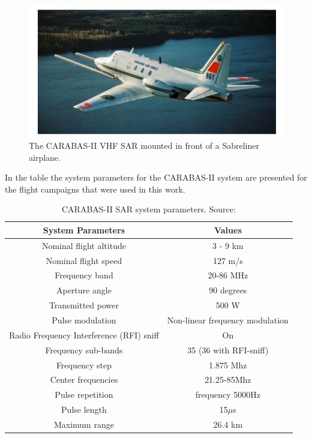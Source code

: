 \begin{figure}[H]
    \centering
    \includegraphics{chapter6/sabreliner.jpg}
    \caption{The CARABAS-II VHF SAR mounted in front of a Sabreliner airplane.}
    \label{fig:sabreliner}
\end{figure}

In the table \cite{tab:carabas_system} the system parameters for the CARABAS-II system are presented for the
flight campaigns that were used in this work. 

\begin{table}[H]
    \centering
    \begin{tabular}{|c|c|}
        \hline
        System Parameters & Values \\ \hline \hline
        Nominal flight altitude & 3 - 9 km \\ \hline
        Nominal flight speed & 127 m/s \\ \hline
        Frequency band & 20-86 MHz \\ \hline
        Aperture angle & 90 degrees \\ \hline
        Transmitted power & 500 W \\ \hline
        Pulse modulation & Non-linear frequency modulation \\ \hline
        Radio Frequency Interference (RFI) sniff & On \\ \hline
        Frequency sub-bands & 35 (36 with RFI-sniff) \\ \hline
        Frequency step & 1.875 Mhz \\ \hline
        Center frequencies & 21.25-85Mhz \\ \hline
        Pulse repetition & frequency 5000Hz \\ \hline
        Pulse length & 15$\mu$s \\ \hline
        Maximum range & 26.4 km \\ \hline
    \end{tabular}
    \caption{CARABAS-II SAR system parameters. Source: \cite{76}}
    \label{tab:carabas_system}
\end{table}

